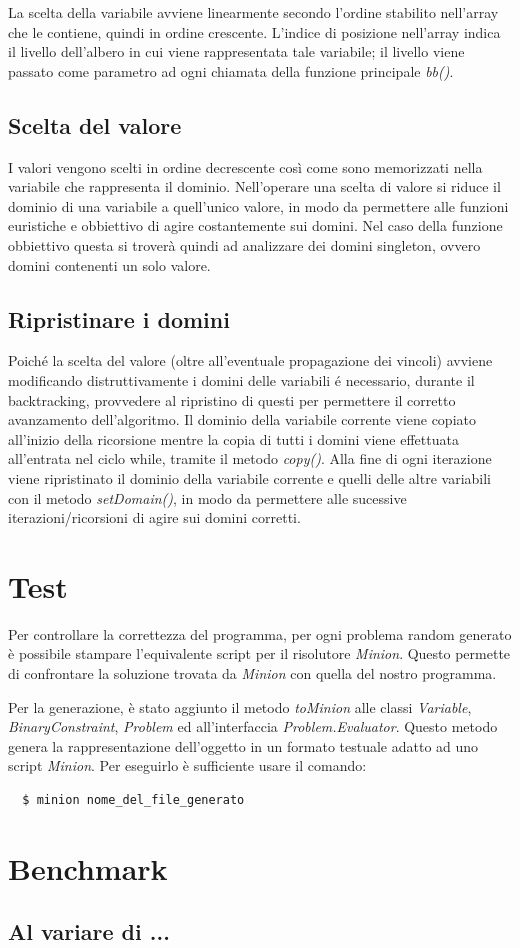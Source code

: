 \documentclass[a4paper,12pt,italian]{article}
\begin{document}
La scelta della variabile avviene linearmente secondo l'ordine
stabilito nell'array che le contiene, quindi in ordine crescente. 
L'indice di posizione nell'array indica il livello dell'albero in cui viene
rappresentata tale
variabile; il livello viene passato come parametro ad ogni chiamata della
funzione principale \textit{bb()}.

\subsection{Scelta del valore}

I valori vengono scelti in ordine decrescente cos\`i come sono memorizzati
nella variabile che rappresenta il dominio. Nell'operare una scelta di valore
si riduce il dominio di una variabile a quell'unico valore, in modo da
permettere
alle funzioni euristiche e obbiettivo di agire costantemente sui domini.
Nel caso della funzione obbiettivo questa si trover\`a quindi ad analizzare
dei domini singleton, ovvero domini contenenti un solo valore.

\subsection{Ripristinare i domini}

Poich\'e la scelta del valore (oltre all'eventuale propagazione dei
vincoli) avviene modificando distruttivamente i domini delle variabili
\'e necessario, durante il backtracking, provvedere al ripristino di
questi per permettere il corretto avanzamento dell'algoritmo.  Il
dominio della variabile corrente viene copiato all'inizio della
ricorsione mentre la copia di tutti i domini viene effettuata
all'entrata nel ciclo while, tramite il metodo \textit{copy()}.  Alla
fine di ogni iterazione viene ripristinato il dominio della variabile
corrente e quelli delle altre variabili con il metodo
\textit{setDomain()}, in modo da permettere alle sucessive
iterazioni/ricorsioni di agire sui domini corretti.

\section{Test}

Per controllare la correttezza del programma, per ogni problema random
generato \`e possibile stampare l'equivalente script per il risolutore
\textit{Minion}. Questo permette di confrontare la soluzione trovata
da \textit{Minion} con quella del nostro programma.

Per la generazione, \`e stato aggiunto il metodo \textit{toMinion}
alle classi \textit{Variable}, \textit{BinaryConstraint},
\textit{Problem} ed all'interfaccia \textit{Problem.Evaluator}. Questo
metodo genera la rappresentazione dell'oggetto in un formato testuale
adatto ad uno script \textit{Minion}. Per eseguirlo \`e sufficiente
usare il comando:

\begin{verbatim}
  $ minion nome_del_file_generato
\end{verbatim}

\section{Benchmark}

\subsection{Al variare di ...}
\end{document}
